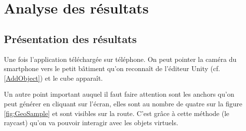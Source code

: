 \chapter{Analyse des résultats}



\newpage
\section{Présentation des résultats}\label{ResultsShow}
Une fois l'application téléchargée sur téléphone. On peut pointer la caméra du smartphone vers le
petit bâtiment qu'on reconnaît de l'éditeur Unity (cf. \ref{AddObject}) et le cube apparaît.

Un autre point important auquel il faut faire attention sont les anchors qu'on peut générer en cliquant sur l'écran, elles sont au
nombre de quatre sur la figure \ref{fig:GeoSample} et sont visibles sur la route. C'est grâce à cette méthode (le \acrshort{raycast})
qu'on va pouvoir interagir avec les objets virtuels.

